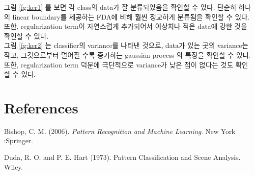 \documentclass{article} %
\begin{document}
그림 \ref{fg:ker1} 를 보면 각 class의 data가 잘 분류되었음을 확인할 수 있다. 단순히 하나의 linear boundary를 제공하는 FDA에 비해 훨씬 정교하게 분류됨을 확인할 수 있다. 또한, regularization term이 자연스럽게 추가되어서 이상치나 적은 data에 강한 것을 확인할 수 있다. \\

그림 \ref{fg:ker2} 는 classifier의 variance를 나타낸 것으로, data가 있는 곳의 variance는 작고, 그것으로부터 멀어질 수록 증가하는 gaussian process 의 특징을 확인할 수 있다. 또한, regularization term 덕분에 극단적으로 variance가 낮은 점이 없다는 것도 확인할 수 있다.

\section{References}
Bishop, C. M. (2006). \textit{Pattern Recognition and Machine Learning}. New York :Springer.

Duda, R. O. and P. E. Hart (1973). Pattern Classification and Scene Analysis. Wiley.
\end{document}
